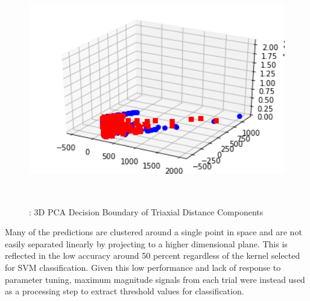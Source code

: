 \documentclass{llncs}
\begin{document}
    
\begin{figure}
	\centering
	\includegraphics[width=12cm, height=10cm]{images/Classification/3D_PCA.png} 
	\caption{: 3D PCA Decision Boundary of Triaxial Distance Components}
	\label{Figure 2: 3D Plot of Linear Kernel SVM with Triaxial Distance Components}
\end{figure}    

Many of the predictions are clustered around a single point in space and are not easily separated linearly by projecting to a higher dimensional plane. This is reflected in the low accuracy around 50 percent regardless of the kernel selected for SVM classification. Given this low performance and lack of response to parameter tuning, maximum magnitude signals from each trial were instead used as a processing step to extract threshold values for classification.
	
\end{document}

